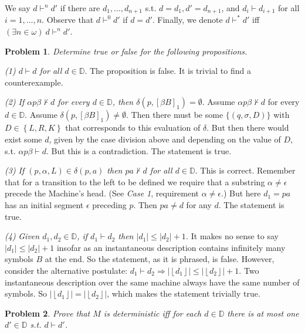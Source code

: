 \documentclass[a4paper, 12pt]{article}
\newtheorem{problem}{Problem}
\newtheorem{problem}{Problem}
\begin{document}
We say $d \vdash^n d'$ if there are $d_1, \ldots, d_{n+1}$ s.t. $d = d_1, d' =
d_{n+1}$, and $d_i \vdash d_{i + 1}$ for all $i = 1, \ldots, n$. Observe that $d
\vdash^0 d'$ if $d = d'$. Finally, we denote $d \vdash^{*} d'$ iff $(\exists n
\in \omega) ~ d \vdash^n d'$.

\begin{problem}
    Determine true or false for the following propositions.
\end{problem}

\textit{(1) $d \vdash d$ for all $d \in \mathbb{D}$}. The proposition is false.
It is trivial to find a counterexample.

\textit{(2) If $\alpha p \beta  \not\vdash  d$ for every $d \in \mathbb{D}$,
then $\delta(p, [\beta B]_1) = \emptyset$}. Assume $\alpha p \beta \not\vdash d$
for every $d \in \mathbb{D}$. Assume $\delta(p, [\beta B]_1) \neq \emptyset$.
Then there must be some $\{(q, \sigma, D)\}$ with $D \in \left\{ L, R, K
\right\} $ that corresponds to this evaluation of $\delta$. But then there would
exist some $d$, given by the case division above and depending on the value of
$D$, s.t. $\alpha p \beta \vdash d$. But this is a contradiction. The statement
is true.

\textit{(3) If $(p, \alpha, L) \in \delta(p, a)$ then $pa \not\vdash d$ for all
$d \in \mathbb{D}$}. This is correct. Remember that for a transition to the left
to be defined we require that a substring $\alpha \neq \epsilon$ precede the
Machine's head. (See \textit{Case 1}, requirement $\alpha \neq \epsilon$.) But
here $d_1 = pa$ has an initial segment $\epsilon$ preceding $p$. Then $pa \neq
d$ for any $d$. The statement is true.

\textit{(4)} \textit{  Given $d_1, d_2 \in \mathbb{D}$, if $d_1 \vdash d_2$ then
$|d_1| \leq |d_2| + 1$. } It makes no sense to say $|d_1| \leq |d_2| + 1$
insofar as an instantaneous description contains infinitely many symbols $B$ at
the end. So the statement, as it is phrased, is false. However, consider the
alternative postulate: $d_1 \vdash d_2 \Rightarrow |\left\lfloor d_1
\right\rfloor| \leq | \left\lfloor d_2 \right\rfloor | + 1$. Two instantaneous
description over the same machine always have the same number of symbols. So $ |
\left\lfloor d_1 \right\rfloor| = | \left\lfloor d_2 \right\rfloor | $, which
makes the statement trivially true.

\begin{problem}
    Prove that $M$ is deterministic iff for each $d \in \mathbb{D}$ there is
    \textit{at most} one $d' \in \mathbb{D}$ s.t. $d \vdash d'$.
\end{problem}
\end{document}
